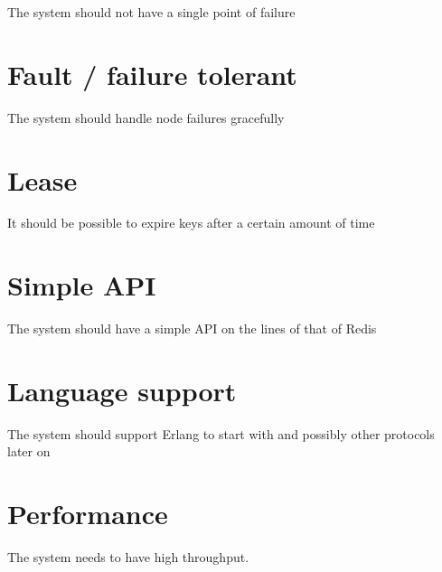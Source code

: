 The system should not have a single point of failure

\section{Fault / failure tolerant}

The system should handle node failures gracefully


\section{Lease}

It should be possible to expire keys after a certain amount of time

\section{Simple API}

The system should have a simple API on the lines of that of Redis

\section{Language support}

The system should support Erlang to start with and possibly other protocols
later on

\section{Performance}

The system needs to have high throughput.

